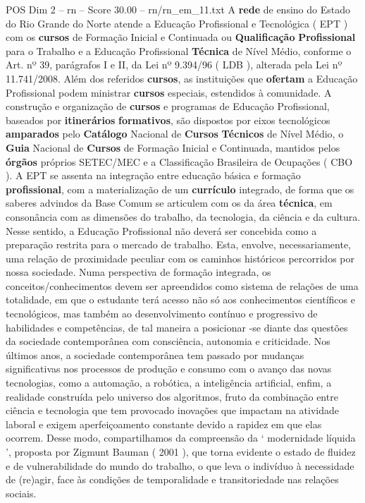 \begin{textsample}{POS Dim 2 – rn – Score 30.00 – rn/rn\_em\_11.txt}
A \textbf{rede} de ensino do Estado do Rio Grande do Norte atende a Educação Profissional e Tecnológica ( EPT ) com os \textbf{cursos} de Formação Inicial e Continuada ou \textbf{Qualificação} \textbf{Profissional} para o Trabalho e a Educação Profissional \textbf{Técnica} de Nível Médio, conforme o Art. nº 39, parágrafos I e II, da Lei nº 9.394/96 ( LDB ), alterada pela Lei nº 11.741/2008.
Além dos referidos \textbf{cursos}, as instituições que \textbf{ofertam} a Educação Profissional podem ministrar \textbf{cursos} especiais, estendidos à comunidade.
A construção e organização de \textbf{cursos} e programas de Educação Profissional, baseados por \textbf{itinerários} \textbf{formativos}, são dispostos por eixos tecnológicos \textbf{amparados} pelo \textbf{Catálogo} Nacional de \textbf{Cursos} \textbf{Técnicos} de Nível Médio, o \textbf{Guia} Nacional de \textbf{Cursos} de Formação Inicial e Continuada, mantidos pelos \textbf{órgãos} próprios SETEC/MEC e a Classificação Brasileira de Ocupações ( CBO ).
A EPT se assenta na integração entre educação básica e formação \textbf{profissional}, com a materialização de um \textbf{currículo} integrado, de forma que os saberes advindos da Base Comum se articulem com os da área \textbf{técnica}, em consonância com as dimensões do trabalho, da tecnologia, da ciência e da cultura.
Nesse sentido, a Educação Profissional não deverá ser concebida como a preparação restrita para o mercado de trabalho.
Esta, envolve, necessariamente, uma relação de proximidade peculiar com os caminhos históricos percorridos por nossa sociedade.
Numa perspectiva de formação integrada, os conceitos/conhecimentos devem ser apreendidos como sistema de relações de uma totalidade, em que o estudante terá acesso não só aos conhecimentos científicos e tecnológicos, mas também ao desenvolvimento contínuo e progressivo de habilidades e competências, de tal maneira a posicionar -se diante das questões da sociedade contemporânea com consciência, autonomia e criticidade.
Nos últimos anos, a sociedade contemporânea tem passado por mudanças significativas nos processos de produção e consumo com o avanço das novas tecnologias, como a automação, a robótica, a inteligência artificial, enfim, a realidade construída pelo universo dos algoritmos, fruto da combinação entre ciência e tecnologia que tem provocado inovações que impactam na atividade laboral e exigem aperfeiçoamento constante devido a rapidez em que elas ocorrem.
Desse modo, compartilhamos da compreensão da ‘ modernidade líquida ’, proposta por Zigmunt Bauman ( 2001 ), que torna evidente o estado de fluidez e de vulnerabilidade do mundo do trabalho, o que leva o indivíduo à necessidade de (re)agir, face às condições de temporalidade e transitoriedade nas relações sociais.

\end{textsample}
